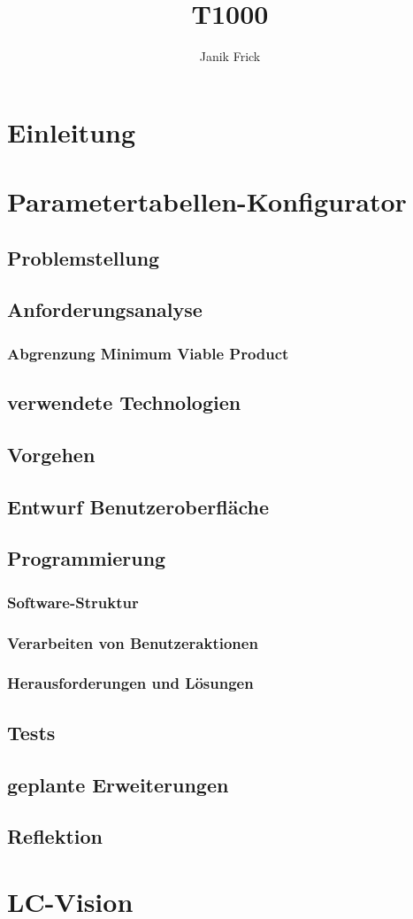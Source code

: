\documentclass[10pt,a4paper]{article}
\author{Janik Frick}
\title{T1000}
\begin{document}
\tableofcontents
\newpage
\section{Einleitung}
\section{Parametertabellen-Konfigurator}
\subsection{Problemstellung}
\subsection{Anforderungsanalyse}
\subsubsection{Abgrenzung Minimum Viable Product}
\subsection{verwendete Technologien}
\subsection{Vorgehen}
\subsection{Entwurf Benutzeroberfläche}
\subsection{Programmierung}
\subsubsection{Software-Struktur}
\subsubsection{Verarbeiten von Benutzeraktionen}
\subsubsection{Herausforderungen und Lösungen}
\subsection{Tests}
\subsection{geplante Erweiterungen}
\subsection{Reflektion}

\section{LC-Vision}
\end{document}
